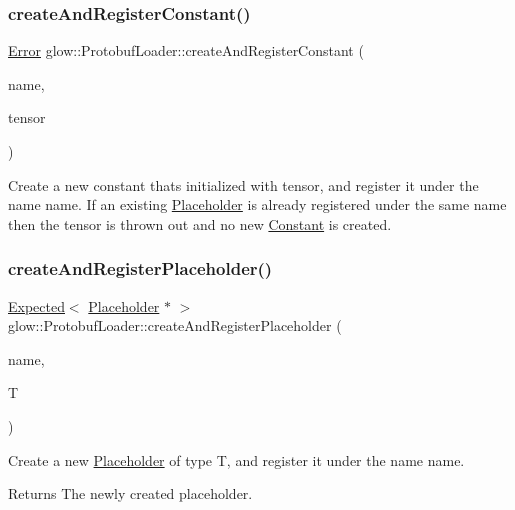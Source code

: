 \subsubsection{\texorpdfstring{create\+And\+Register\+Constant()}{createAndRegisterConstant()}}
{\footnotesize\ttfamily \hyperlink{namespaceglow_afdb176c3a672ef66db0ecfc19a8d39bf}{Error} glow\+::\+Protobuf\+Loader\+::create\+And\+Register\+Constant (\begin{DoxyParamCaption}\item[{llvm\+::\+String\+Ref}]{name,  }\item[{\hyperlink{classglow_1_1_tensor}{Tensor} \&\&}]{tensor }\end{DoxyParamCaption})\hspace{0.3cm}{\ttfamily [protected]}}

Create a new constant that\textquotesingle{}s initialized with {\ttfamily tensor}, and register it under the name {\ttfamily name}. If an existing \hyperlink{classglow_1_1_placeholder}{Placeholder} is already registered under the same name then the tensor is thrown out and no new \hyperlink{classglow_1_1_constant}{Constant} is created. \mbox{\label{classglow_1_1_protobuf_loader_a423b742fbe850b05ee21e3dd06276fd2}} 
\subsubsection{\texorpdfstring{create\+And\+Register\+Placeholder()}{createAndRegisterPlaceholder()}}
{\footnotesize\ttfamily \hyperlink{classglow_1_1detail_1_1_glow_expected}{Expected}$<$ \hyperlink{classglow_1_1_placeholder}{Placeholder} $\ast$ $>$ glow\+::\+Protobuf\+Loader\+::create\+And\+Register\+Placeholder (\begin{DoxyParamCaption}\item[{llvm\+::\+String\+Ref}]{name,  }\item[{\hyperlink{structglow_1_1_type}{Type\+Ref}}]{T }\end{DoxyParamCaption})\hspace{0.3cm}{\ttfamily [protected]}}

Create a new \hyperlink{classglow_1_1_placeholder}{Placeholder} of type {\ttfamily T}, and register it under the name {\ttfamily name}. \begin{DoxyReturn}{Returns}
The newly created placeholder. 
\end{DoxyReturn}
\mbox{\label{classglow_1_1_protobuf_loader_a622b34ab4bbe4cfc5bcc5b03af58c214}} 
